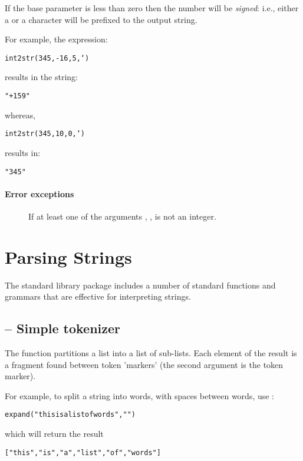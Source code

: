 If the base parameter  is less than zero then the number will be \emph{signed}: i.e., either a \q{+} or a \q{-} character will be prefixed to the output string.

For example, the expression:
\begin{alltt}
int2str(345,-16,5,` )
\end{alltt}
results in the string:
\begin{alltt}
"  +159"
\end{alltt}
whereas, 
\begin{alltt}
int2str(345,10,0,` )
\end{alltt}
results in:
\begin{alltt}
"345"
\end{alltt}

\paragraph{Error exceptions}
\begin{description}
\item[]
If at least one of the arguments , ,  is not an integer.
\end{description}


\section{Parsing Strings}
\label{string:stdparse}
The  standard library package includes a number of standard functions and grammars that are effective for interpreting strings.


\subsection{\texorpdfstring{ -- }{}Simple tokenizer}
\label{stdlib:expand}

The  function partitions a list into a list of sub-lists. Each element of the result is a fragment found between token 'markers' (the second argument is the token marker).

For example, to split a string into words, with spaces between words, use  :
\begin{alltt}
expand("this is a list of words"," ")
\end{alltt}
which will return the result
\begin{alltt}
["this", "is", "a", "list", "of", "words"]
\end{alltt}


